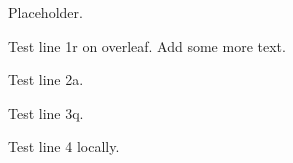 

Placeholder.

Test line 1r on overleaf. Add some more text.

Test line 2a.

Test line 3q.

Test line 4 locally.

